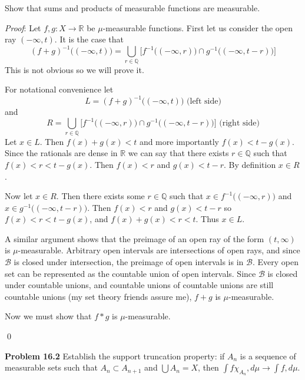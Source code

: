 \documentclass[12pt]{article}
\newcommand{\problem}[1]{\hspace{-4 ex} \large \textbf{Problem #1} }
\renewenvironment{proof}{\hspace{-4 ex} \emph{Proof}:}{\qed}
\newcommand{\RR}{\mathbb{R}}
\newcommand{\QQ}{\mathbb{Q}}
\newcommand{\BB}{\mathcal{B}}
\begin{document}
\bigbreak

Show that sums and products of measurable functions are measurable. \bigbreak

\begin{proof}
	Let $f,g: X \to \RR$ be $\mu$-measurable functions. First let us consider the open ray $(-\infty,t)$. It is the case that 
	$$
	(f+g)^{-1}\big ( (-\infty,t) \big) = \bigcup_{r \in \QQ} \Big[ f^{-1}\big( (-\infty,r) \big) \cap g^{-1}\big( (-\infty,t-r) \big) \Big]
	$$
	This is not obvious so we will prove it. \bigbreak
	
	For notational convenience let
	$$
	L = (f+g)^{-1}\big ( (-\infty,t) \big) \text{\ \ \ \ (left side)}
	$$
	and 
	$$
	R = \bigcup_{r \in \QQ} \Big[ f^{-1}\big( (-\infty,r) \big) \cap g^{-1}\big( (-\infty,t-r) \big) \Big] \text{\ \ \ \ \ (right side)}
	$$
	Let $x \in L$. Then $f(x)+g(x) < t$ and more importantly $f(x) < t - g(x)$. Since the rationals are dense in $\RR$ we can say that there exists $r \in \QQ$ such that $f(x) < r < t-g(x)$. Then $f(x) < r$ and $g(x) < t-r$. By definition $x \in R$. \bigbreak
	
	Now let $x \in R$. Then there exists some $r \in \QQ$ such that $x \in f^{-1}\big( (-\infty,r) \big)$ and $x \in g^{-1}\big( (-\infty,t-r) \big)$. Then $f(x)<r$ and $g(x)< t-r$ so $f(x) < r < t-g(x)$, and $f(x)+g(x) < r < t$. Thus $x \in L$. \bigbreak
	
	A similar argument shows that the preimage of an open ray of the form $(t, \infty)$ is $\mu$-measurable. Arbitrary open intervals are intersections of open rays, and since $\BB$ is closed under intersection, the preimage of open intervals is in $\BB$. Every open set can be represented as the countable union of open intervals. Since $\BB$ is closed under countable unions, and countable unions of countable unions are still countable unions (my set theory friends assure me), $f+g$ is $\mu$-measurable. \bigbreak
	
	Now we must show that $f*g$ is $\mu$-measurable.
	
\end{proof}


\bigbreak
\problem{16.2} Establish the support truncation property: if $A_n$ is a sequence of measurable sets such that $A_n\subset A_{n+1}$ and $\bigcup A_n=X$, then $\int f\chi_{A_n},d\mu\to\int f,d\mu$.
\bigbreak
\end{document}
